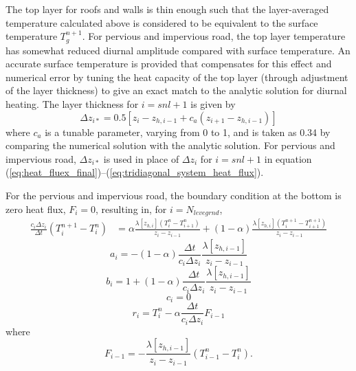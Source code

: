 \documentclass[12pt,authoryear]{elsarticle}
\numberwithin{equation}{section} %
\begin{document}
The top layer for roofs and walls is thin enough such that the layer-averaged temperature calculated above is considered to be equivalent to the surface temperature $T_{g}^{n+1}$. For pervious and impervious road, the top layer temperature has somewhat reduced diurnal amplitude compared with surface temperature. An accurate surface temperature is provided that compensates for this effect and numerical error by tuning the heat capacity of the top layer (through adjustment of the layer thickness) to give an exact match to the analytic solution for diurnal heating. The layer thickness for $i=snl+1$ is given by
\begin{equation}
\Delta z_{i*}=0.5\left[z_{i}-z_{h,i-1}+c_{a}(z_{i+1}-z_{h,i-1})\right]
\end{equation}
where $c_{a}$ is a tunable parameter, varying from 0 to 1, and is taken as 0.34 by comparing the numerical solution with the analytic solution. For pervious and impervious road, $\Delta z_{i*}$ is used in place of $\Delta z_{i}$ for $i=snl+1$ in equation (\ref{eq:heat_fluex_final})--(\ref{eq:tridiagonal_system_heat_flux}).

For the pervious and impervious road, the boundary condition at the bottom is zero heat flux, $F_{i}=$0, resulting in, for $i=N_{levegrnd}$,
\begin{equation}
\label{eq:temperature_final}
\begin{aligned}
\frac{c_{i}\Delta z_{i}}{\Delta t}(T_{i}^{n+1} -T_{i}^{n})&=\alpha\frac{\lambda[z_{h,i}](T_{i}^{n}-T_{i+1}^{n})}{z_{i}-z_{i-1}}+(1-\alpha)\frac{\lambda[z_{h,i}](T_{i}^{n+1}-T_{i+1}^{n+1})}{z_{i}-z_{i-1}}
\end{aligned}
\end{equation}
\begin{equation}
a_{i} = -(1-\alpha)\frac{\Delta t}{c_{i}\Delta z_{i}}\frac{\lambda [z_{h,i-1}]}{z_{i}-z_{i-1}}
\end{equation}
\begin{equation}
b_{i} = 1+(1-\alpha)\frac{\Delta t}{c_{i} \Delta z_{i}}\frac{\lambda [z_{h,i-1}]}{z_{i}-z_{i-1}}
\end{equation}
\begin{equation}
c_{i}=0
\end{equation}
\begin{equation}
r_{i}=T_{i}^{n}-\alpha\frac{\Delta t}{c_{i}\Delta z_{i}}F_{i-1}
\end{equation}
where
\begin{equation}
\label{eq:flux_i-1}
F_{i-1} = -\frac{\lambda[z_{h,i-1}]}{z_{i}-z_{i-1}}(T_{i-1}^n-T_{i}^n).
\end{equation}
\end{document}
